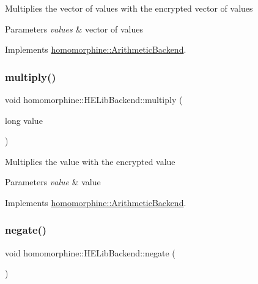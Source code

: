 Multiplies the vector of values with the encrypted vector of values


\begin{DoxyParams}{Parameters}
{\em values} & vector of values \\
\hline
\end{DoxyParams}


Implements \mbox{\hyperlink{classhomomorphine_1_1_arithmetic_backend_a80f2424d26fcfad4803f6a0e5a9cdd2d}{homomorphine\+::\+Arithmetic\+Backend}}.

\mbox{\label{classhomomorphine_1_1_h_e_lib_backend_a49d4e073eecc4759f12f60188a533835}} 
\subsubsection{\texorpdfstring{multiply()}{multiply()}\hspace{0.1cm}{\footnotesize\ttfamily [2/2]}}
{\footnotesize\ttfamily void homomorphine\+::\+H\+E\+Lib\+Backend\+::multiply (\begin{DoxyParamCaption}\item[{long}]{value }\end{DoxyParamCaption})\hspace{0.3cm}{\ttfamily [virtual]}}

Multiplies the value with the encrypted value


\begin{DoxyParams}{Parameters}
{\em value} & value \\
\hline
\end{DoxyParams}


Implements \mbox{\hyperlink{classhomomorphine_1_1_arithmetic_backend_a22f4c598c5a3987ef6efe5925f4c5b81}{homomorphine\+::\+Arithmetic\+Backend}}.

\mbox{\label{classhomomorphine_1_1_h_e_lib_backend_acb1ed456fa91fc1dfe878abb068f3f34}} 
\subsubsection{\texorpdfstring{negate()}{negate()}}
{\footnotesize\ttfamily void homomorphine\+::\+H\+E\+Lib\+Backend\+::negate (\begin{DoxyParamCaption}{ }\end{DoxyParamCaption})\hspace{0.3cm}{\ttfamily [virtual]}}

